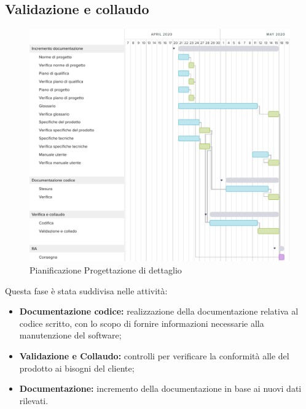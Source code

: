 \subsection{Validazione e collaudo}
\begin{figure}[h!]
	\includegraphics[width=\textwidth]{res/img/g5}
	\caption{Pianificazione Progettazione di dettaglio}
\end{figure}
Questa fase è stata suddivisa nelle attività:
\begin{itemize}
	\item \textbf{Documentazione codice:} realizzazione della documentazione relativa al codice scritto, con lo scopo di fornire informazioni necessarie alla manutenzione del software;
	\item \textbf{Validazione e Collaudo:} controlli per verificare la conformità alle del prodotto ai bisogni del cliente;
	\item \textbf{Documentazione:} incremento della documentazione in base ai nuovi dati rilevati.
\end{itemize}
